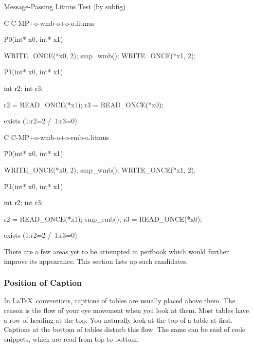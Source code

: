 \begin{listing*}[tbh]%
\caption{Message-Passing Litmus Test (by subfig)}%
\label{lst:app:styleguide:Message-Passing Litmus Test (subfig)}%
{\scriptsize%
\begin{verbbox}[\LstLineNo]
C C-MP+o-wmb-o+o-o.litmus

{
}

P0(int* x0, int* x1) {

  WRITE_ONCE(*x0, 2);
  smp_wmb();
  WRITE_ONCE(*x1, 2);

}

P1(int* x0, int* x1) {

  int r2;
  int r3;

  r2 = READ_ONCE(*x1);
  r3 = READ_ONCE(*x0);

}


exists (1:r2=2 /\ 1:r3=0)
\end{verbbox}
}
\centering
\hspace*{\fill}
\hspace{\fill}
{\scriptsize%
\begin{verbbox}[\LstLineNo]
C C-MP+o-wmb-o+o-rmb-o.litmus

{
}

P0(int* x0, int* x1) {

  WRITE_ONCE(*x0, 2);
  smp_wmb();
  WRITE_ONCE(*x1, 2);

}

P1(int* x0, int* x1) {

  int r2;
  int r3;

  r2 = READ_ONCE(*x1);
  smp_rmb();
  r3 = READ_ONCE(*x0);

}

exists (1:r2=2 /\ 1:r3=0)
\end{verbbox}
}%
\hspace*{\fill}%
\end{listing*}

There are a few areas yet to be attempted in perfbook
which would further improve its appearance.
This section lists up such candidates.

\subsubsection{Position of Caption}
\label{sec:app:styleguide:Position of Caption}

In \LaTeX\ conventions, captions of tables are usually placed
above them. The reason is the flow of your eye movement
when you look at them. Most tables have a row of heading at the
top. You naturally look at the top of a table at first. Captions at
the bottom of tables disturb this flow.
The same can be said of code snippets, which are read from
top to bottom.

